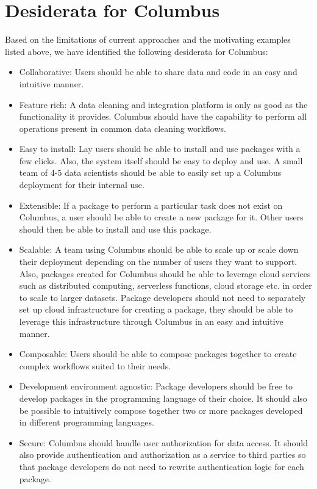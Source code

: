 \section{Desiderata for Columbus}
Based on the limitations of current approaches and the motivating examples listed above, we have 
identified the following desiderata for Columbus:

\begin{itemize}
  \item Collaborative: Users should be able to share data and code in an easy and intuitive manner.
  \item Feature rich: A data cleaning and integration platform is only as good as the
    functionality it provides. Columbus should have the capability to perform all operations
    present in common data cleaning workflows.
  \item Easy to install: Lay users should be able to install and use packages with a few
    clicks. Also, the system itself should be easy to deploy and use. A small team of 4-5 data 
    scientists should be able to easily set up a Columbus deployment for their internal use. 
  \item Extensible: If a package to perform a particular task does not exist on Columbus, a user 
    should be able to create a new package for it. Other users should then be able to install and
    use this package.
  \item Scalable: A team using Columbus should be able to scale up or scale down their deployment 
    depending on the number of users they want to support. Also, packages created for Columbus 
    should be able to leverage cloud services such as distributed computing, serverless functions,
    cloud storage etc. in order to scale to larger datasets. Package developers should not need to
    separately set up cloud infrastructure for creating a package, they should be able to leverage
    this infrastructure through Columbus in an easy and intuitive manner.
  \item Composable: Users should be able to compose packages together to create complex workflows
    suited to their needs.
  \item Development environment agnostic: Package developers should be free to develop packages in
    the programming language of their choice. It should also be possible to intuitively compose 
    together two or more packages developed in different programming languages.
  \item Secure: Columbus should handle user authorization for data access. It should also provide
    authentication and authorization as a service to third parties so that package developers do
    not need to rewrite authentication logic for each package.
\end{itemize}
